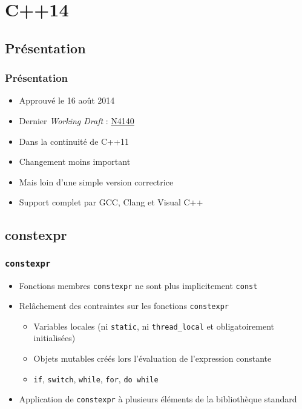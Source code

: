 \documentclass[C++.tex]{subfiles}
\begin{document}
\section{C++14}
\subsection*{Présentation}
\begin{frame}
	\frametitle{Présentation}
	\begin{itemize}
		\item Approuvé le 16 août 2014
		\item Dernier \textit{Working Draft} : \href{https://timsong-cpp.github.io/cppwp/n4140/draft.pdf}{N4140}
		\item Dans la continuité de C++11
		\item Changement moins important
		\item Mais loin d'une simple version correctrice
		\item Support complet par GCC, Clang et Visual C++

	\end{itemize}
\end{frame}

\subsection*{constexpr}
\begin{frame}[fragile]
	\frametitle{\lstinline|constexpr|}
	\begin{itemize}
		\item Fonctions membres \lstinline|constexpr| ne sont plus implicitement \lstinline|const|
		\item Relâchement des contraintes sur les fonctions \lstinline|constexpr|
		\begin{itemize}
			\item Variables locales (ni \lstinline|static|, ni \lstinline|thread_local| et obligatoirement initialisées)
			\item Objets mutables créés lors l'évaluation de l'expression constante
			\item \lstinline|if|, \lstinline|switch|, \lstinline|while|, \lstinline|for|, \lstinline|do while|
		\end{itemize}
		\item Application de \lstinline|constexpr| à plusieurs éléments de la bibliothèque standard
	\end{itemize}
\end{frame}
\end{document}
